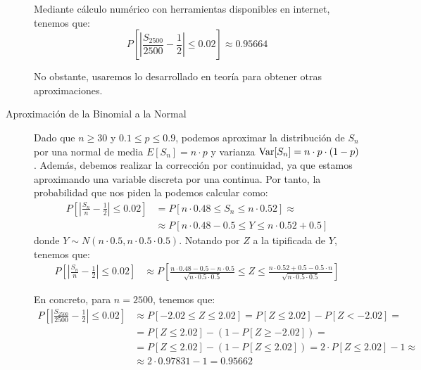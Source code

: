 \begin{ejercicio}
\begin{description}
        Mediante cálculo numérico con herramientas disponibles en internet, tenemos que:
        \begin{equation*}
            P\left[\left|\frac{S_{2500}}{2500} - \frac{1}{2}\right| \leq 0.02\right] \approx 0.95664
        \end{equation*}

        No obstante, usaremos lo desarrollado en teoría para obtener otras aproximaciones.

        \item [Aproximación de la Binomial a la Normal] Dado que $n\geq 30$ y $0.1 \leq p \leq 0.9$, podemos aproximar la distribución de $S_{n}$ por una normal de media $E[S_{n}] = n \cdot p$ y varianza $\operatorname{Var}[S_{n}] = n \cdot p \cdot (1-p)$. Además, debemos realizar la corrección por continuidad, ya que estamos aproximando una variable discreta por una continua. Por tanto, la probabilidad que nos piden la podemos calcular como:
        \begin{align*}
            P\left[\left|\frac{S_{n}}{n} - \frac{1}{2}\right| \leq 0.02\right] &= P\left[n \cdot 0.48 \leq S_{n} \leq n \cdot 0.52\right]
            \approx\\&\approx P\left[n\cdot 0.48 - 0.5 \leq Y \leq n\cdot 0.52 + 0.5\right]
        \end{align*}
        donde $Y \sim N(n \cdot 0.5, n \cdot 0.5 \cdot 0.5)$. Notando por $Z$ a la tipificada de $Y$, tenemos que:
        \begin{align*}
            P\left[\left|\frac{S_{n}}{n} - \frac{1}{2}\right| \leq 0.02\right] &\approx P\left[\frac{n\cdot 0.48 - 0.5-n\cdot 0.5}{\sqrt{n \cdot 0.5 \cdot 0.5}} \leq Z \leq \frac{n\cdot 0.52 + 0.5-0.5\cdot n}{\sqrt{n \cdot 0.5 \cdot 0.5}}\right]
        \end{align*}

        En concreto, para $n=2500$, tenemos que:
        \begin{align*}
            P\left[\left|\frac{S_{2500}}{2500} - \frac{1}{2}\right| \leq 0.02\right] &\approx P\left[-2.02 \leq Z \leq 2.02\right]=P[Z \leq 2.02] - P[Z < -2.02]
            =\\&= P[Z \leq 2.02] -(1-P[Z \geq -2.02])
            =\\&= P[Z \leq 2.02] - (1-P[Z \leq 2.02])
            = 2 \cdot P[Z \leq 2.02] - 1
            \approx \\& \approx 2 \cdot 0.97831 - 1= 0.95662
        \end{align*}


\end{description}
\end{ejercicio}
